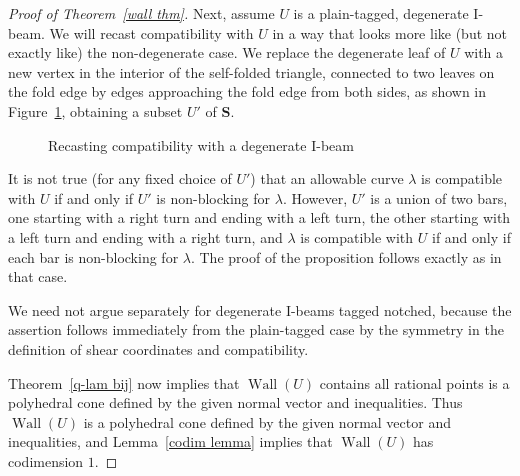 \documentclass{amsart}
\theoremstyle{definition}
\theoremstyle{remark}
\numberwithin{equation}{section}
\newcommand{\0}{{\mathbf{0}}}
\renewcommand{\S}{\mathbf{S}}
\newcommand{\Wall}{\operatorname{Wall}}
\begin{document}
\begin{proof}[Proof of Theorem~\ref{wall thm}]
Next, assume $U$ is a plain-tagged, degenerate I-beam.
We will recast compatibility with $U$ in a way that looks more like (but not exactly like) the non-degenerate case.
We replace the degenerate leaf of $U$ with a new vertex in the interior of the self-folded triangle, connected to two leaves on the fold edge by edges approaching the fold edge from both sides, as shown in Figure~\ref{degen recast}, obtaining a subset $U'$ of $\S$.
\begin{figure}
\qquad{}
\caption{Recasting compatibility with a degenerate I-beam}
\label{degen recast}
\end{figure}
It is not true (for any fixed choice of $U'$) that an allowable curve $\lambda$ is compatible with $U$ if and only if $U'$ is non-blocking for $\lambda$.
However, $U'$ is a union of two bars, one starting with a right turn and ending with a left turn, the other starting with a left turn and ending with a right turn, and $\lambda$ is compatible with $U$ if and only if each bar is non-blocking for $\lambda$.
The proof of the proposition follows exactly as in that case.

We need not argue separately for degenerate I-beams tagged notched, because the assertion follows immediately from the plain-tagged case by the symmetry in the definition of shear coordinates and compatibility.

Theorem~\ref{q-lam bij} now implies that $\Wall(U)$ contains all rational points is a polyhedral cone defined by the given normal vector and inequalities.
Thus $\Wall(U)$ is a polyhedral cone defined by the given normal vector and inequalities, and Lemma~\ref{codim lemma} implies that $\Wall(U)$ has codimension $1$.
\end{proof}
\end{document}
